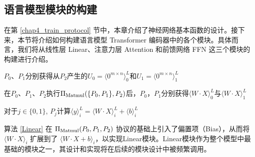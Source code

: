 \subsection{语言模型模块的构建} \label{trans_block}

在第 \ref{chap4_train_protocol} 节中，本章介绍了神经网络基本函数的设计。接下来，本节将介绍如何构建语言模型 Transformer 编码器中的各个模块。具体而言，我们将从线性层 Linear、注意力层 Attention 和前馈网络 FFN 这三个模块的构建进行介绍。

\begin{algorithm}[H]
	\SetAlgoLined
	
	
	$P_0$、$P_1$分别获得从$P_2$产生的$U_0=\langle 0^{m\times n}\rangle_0^L$和$U_1=\langle 0^{m\times n}\rangle_1^L$
	
	在$P_0$、$P_1$、$P_2$执行$\Pi_{\rm Matmul}(\{P_0, P_1\}, P_2)$后，$P_0$，$P_1$分别获得$\langle W\cdot X\rangle_0^L$与$\langle W\cdot X\rangle_1^L$
	
	对于$j\in \{0, 1\}$, $P_j$计算$\langle y\rangle_i^L = \langle W\cdot X\rangle_i^L + \langle b\rangle_i^L$
	
	\caption{ $\Pi_{\rm Linear}(\{P_0, P_1\}, P_2)$ }
	\label{Linear}
\end{algorithm}

算法 \ref{Linear} 在 $\Pi_{\rm Matmul}({P_0, P_1}, P_2)$ 协议的基础上引入了偏置项（Bias），从而将 $\langle W\cdot X\rangle_i$ 扩展到了 $\langle W\cdot X + b\rangle_i$，以实现Linear模块。Linear模块作为整个模型中最基础的模块之一，其设计和实现将在后续的模块设计中被频繁调用。


